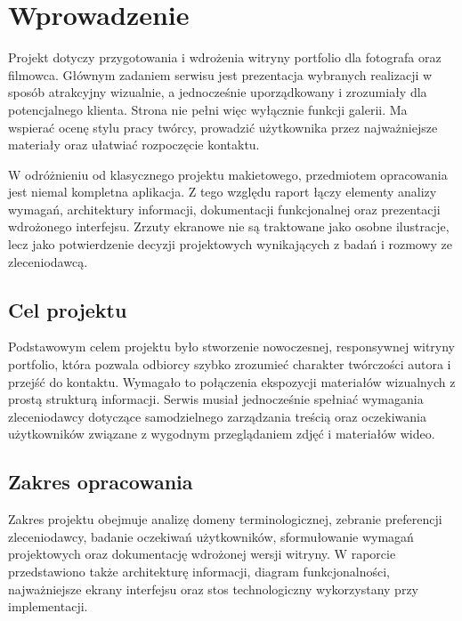 \chapter{Wprowadzenie}

Projekt dotyczy przygotowania i wdrożenia witryny portfolio dla fotografa oraz filmowca. Głównym zadaniem serwisu jest prezentacja wybranych realizacji w sposób atrakcyjny wizualnie, a jednocześnie uporządkowany i zrozumiały dla potencjalnego klienta. Strona nie pełni więc wyłącznie funkcji galerii. Ma wspierać ocenę stylu pracy twórcy, prowadzić użytkownika przez najważniejsze materiały oraz ułatwiać rozpoczęcie kontaktu.

W odróżnieniu od klasycznego projektu makietowego, przedmiotem opracowania jest niemal kompletna aplikacja. Z tego względu raport łączy elementy analizy wymagań, architektury informacji, dokumentacji funkcjonalnej oraz prezentacji wdrożonego interfejsu. Zrzuty ekranowe nie są traktowane jako osobne ilustracje, lecz jako potwierdzenie decyzji projektowych wynikających z badań i rozmowy ze zleceniodawcą.

\section{Cel projektu}

Podstawowym celem projektu było stworzenie nowoczesnej, responsywnej witryny portfolio, która pozwala odbiorcy szybko zrozumieć charakter twórczości autora i przejść do kontaktu. Wymagało to połączenia ekspozycji materiałów wizualnych z prostą strukturą informacji. Serwis musiał jednocześnie spełniać wymagania zleceniodawcy dotyczące samodzielnego zarządzania treścią oraz oczekiwania użytkowników związane z wygodnym przeglądaniem zdjęć i materiałów wideo.

\section{Zakres opracowania}

Zakres projektu obejmuje analizę domeny terminologicznej, zebranie preferencji zleceniodawcy, badanie oczekiwań użytkowników, sformułowanie wymagań projektowych oraz dokumentację wdrożonej wersji witryny. W raporcie przedstawiono także architekturę informacji, diagram funkcjonalności, najważniejsze ekrany interfejsu oraz stos technologiczny wykorzystany przy implementacji.

